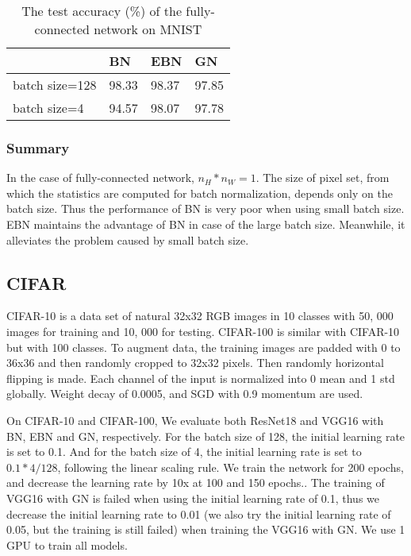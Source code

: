 \documentclass[runningheads]{llncs}
\begin{document}
\begin{table}[!htb]
\caption{The test accuracy (\%) of the fully-connected network on MNIST}
\label{tab_mnist}
\centering
\begin{tabular}{l|lll}
\hline
  & BN & EBN & GN \\
\hline
batch size=128     & 98.33  & 98.37 & 97.85     \\
batch size=4       & 94.57  & 98.07 & 97.78     \\
\hline
\end{tabular}
\end{table}

\subsubsection{Summary} In the case of fully-connected network,  $n_{H}*n_{W}=1$. The size of pixel set, from which the statistics are computed for batch normalization,  depends only on the batch size. Thus the performance of BN is very poor when using small batch size. EBN maintains the advantage of BN in case of the large batch size. Meanwhile, it alleviates the problem caused by small batch size. 

\subsection{CIFAR}


CIFAR-10 \cite{krizhevsky2009learning} is a data set of natural 32x32 RGB images in 10 classes with 50, 000 images for training and 10, 000 for testing. CIFAR-100 is similar with CIFAR-10 but with 100 classes. To augment data, the training images are padded with 0 to 36x36 and then randomly cropped to 32x32 pixels. Then randomly horizontal flipping is made. Each channel of the input is normalized into 0 mean and 1 std globally. Weight decay of 0.0005, and SGD with 0.9 momentum are used. 



On CIFAR-10 and CIFAR-100, We evaluate both ResNet18 \cite{he2016deep} and VGG16 \cite{simonyan2014very} with BN, EBN and GN, respectively. For the batch size of 128, the initial learning rate is set to 0.1. And for the batch size of 4, the initial learning rate is set to $0.1*4/128$, following the linear scaling rule. We train the network for 200 epochs, and decrease the learning rate by 10x at 100 and 150 epochs.. The training of VGG16 with GN is failed when using the initial learning rate of 0.1, thus we decrease the initial learning rate to 0.01 (we also try the initial learning rate of 0.05, but the training is still failed) when training the VGG16 with GN. We use 1 GPU to train all models.
\end{document}
